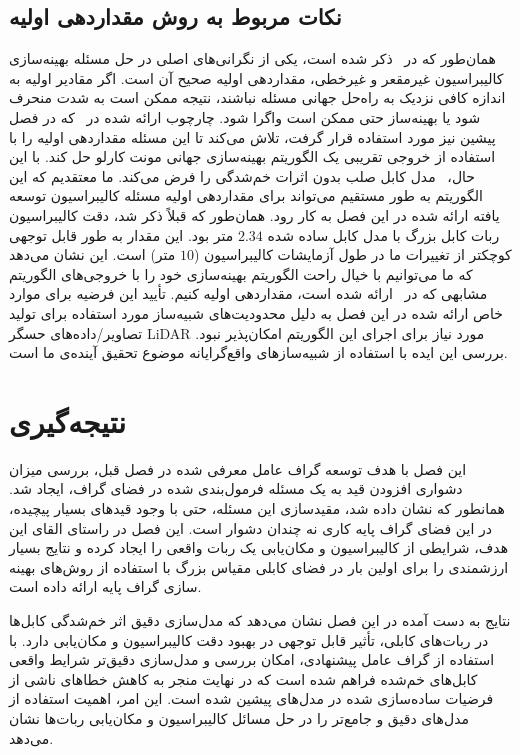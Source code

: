 \subsection{نکات مربوط به روش مقداردهی اولیه}
همان‌طور که در~\cite{khorrambakht2023graph} ذکر شده است، یکی از نگرانی‌های اصلی در حل مسئله بهینه‌سازی کالیبراسیون غیرمقعر و غیرخطی، مقداردهی اولیه صحیح آن است. اگر مقادیر اولیه به اندازه کافی نزدیک به راه‌حل جهانی مسئله نباشند، نتیجه ممکن است به شدت منحرف شود یا بهینه‌ساز حتی ممکن است واگرا شود. چارچوب ارائه شده در~\cite{khorrambakht2023graph} که در فصل پیشین نیز مورد استفاده قرار گرفت، تلاش می‌کند تا این مسئله مقداردهی اولیه را با استفاده از خروجی تقریبی یک الگوریتم بهینه‌سازی جهانی مونت کارلو حل کند. با این حال،~\cite{khorrambakht2023graph} مدل کابل صلب بدون اثرات خم‌شدگی را فرض می‌کند. ما معتقدیم که این الگوریتم به طور مستقیم می‌تواند برای مقداردهی اولیه مسئله کالیبراسیون توسعه یافته ارائه شده در این فصل به کار رود. همان‌طور که قبلاً ذکر شد، دقت کالیبراسیون ربات کابل بزرگ با مدل کابل ساده شده $2.34$ متر بود. این مقدار به طور قابل توجهی کوچکتر از تغییرات ما در طول آزمایشات کالیبراسیون ($10$ متر) است. این نشان می‌دهد که ما می‌توانیم با خیال راحت الگوریتم بهینه‌سازی خود را با خروجی‌های الگوریتم مشابهی که در~\cite{khorrambakht2023graph} ارائه شده است، مقداردهی اولیه کنیم. تأیید این فرضیه برای موارد خاص ارائه شده در این فصل به دلیل محدودیت‌های شبیه‌ساز مورد استفاده برای تولید تصاویر/داده‌های حسگر LiDAR مورد نیاز برای اجرای این الگوریتم امکان‌پذیر نبود. بررسی این ایده با استفاده از شبیه‌سازهای واقع‌گرایانه موضوع تحقیق آینده‌ی ما است.

\section{نتیجه‌گیری}
این فصل با هدف توسعه گراف عامل معرفی شده در فصل قبل، بررسی میزان دشواری افزودن قید به یک مسئله فرمول‌بندی شده در فضای گراف، ایجاد شد. همانطور که نشان داده‌ شد، مقید‌سازی این مسئله، حتی با وجود قیدهای بسیار پیچیده، در این فضای گراف پایه کاری نه چندان دشوار است. این فصل در راستای القای این هدف، شرایطی از کالیبراسیون و مکان‌یابی یک ربات واقعی را ایجاد کرده و نتایج بسیار ارزشمندی را برای اولین بار در فضای کابلی مقیاس بزرگ با استفاده از روش‌های بهینه سازی گراف پایه ارائه داده است.

نتایج به دست آمده در این فصل نشان می‌دهد که مدل‌سازی دقیق اثر خم‌شدگی کابل‌ها در ربات‌های کابلی، تأثیر قابل توجهی در بهبود دقت کالیبراسیون و مکان‌یابی دارد. با استفاده از گراف عامل پیشنهادی، امکان بررسی و مدل‌سازی دقیق‌تر شرایط واقعی کابل‌های خم‌شده فراهم شده است که در نهایت منجر به کاهش خطاهای ناشی از فرضیات ساده‌سازی شده در مدل‌های پیشین شده است. این امر، اهمیت استفاده از مدل‌های دقیق و جامع‌تر را در حل مسائل کالیبراسیون و مکان‌یابی ربات‌ها نشان می‌دهد.

